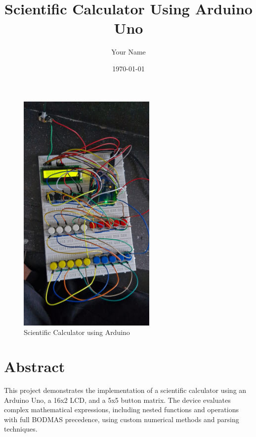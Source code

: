 \documentclass[12pt]{article}
\title{Scientific Calculator Using Arduino Uno}
\author{Your Name}
\date{\today}
\begin{document}
\maketitle

\begin{figure}[h]
    \centering
    \includegraphics[width=0.6\textwidth]{figs/calculator.jpeg}
    \caption{Scientific Calculator using Arduino}
\end{figure}

\section*{Abstract}
This project demonstrates the implementation of a scientific calculator using an Arduino Uno, a 16x2 LCD, and a 5x5 button matrix. The device evaluates complex mathematical expressions, including nested functions and operations with full BODMAS precedence, using custom numerical methods and parsing techniques.
\end{document}
